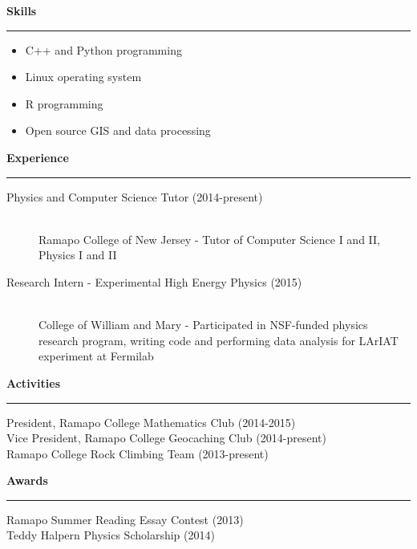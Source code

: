 \documentclass[letterpaper,10pt]{article}
\begin{document}
 \vspace{4 mm}
  
 \large
 \textbf{Skills}
 \vspace{1 mm}
 \hrule
 \normalsize
 
 \begin{multicols}{2}
  \begin{itemize}
   \item C++ and Python programming
   \item Linux operating system
   \item R programming
   \item Open source GIS and data processing
  \end{itemize}
 \end{multicols}
 
 \vspace{4 mm}

 \large
 \textbf{Experience}
 \vspace{1 mm}
 \hrule
 \normalsize
 
 \begin{description}
  \item[Physics and Computer Science Tutor (2014-present)] \hfill \\
   Ramapo College of New Jersey - Tutor of Computer Science I and II, Physics I and II
   
  \item[Research Intern - Experimental High Energy Physics (2015)] \hfill \\
   College of William and Mary - Participated in NSF-funded physics research program, writing code and performing data analysis for LArIAT experiment at Fermilab
 \end{description}
 
 \vspace{4 mm}

 \large
 \textbf{Activities}
 \vspace{1 mm}
 \hrule
 \normalsize
 
 \begin{description}
  \item[President, Ramapo College Mathematics Club (2014-2015)]
  \item[Vice President, Ramapo College Geocaching Club (2014-present)]
  \item[Ramapo College Rock Climbing Team (2013-present)]
 \end{description}
 
 \large
 \textbf{Awards}
 \vspace{1 mm}
 \hrule
 \normalsize
 
 \begin{description}
  \item[Ramapo Summer Reading Essay Contest (2013)]
  \item[Teddy Halpern Physics Scholarship (2014)]
 \end{description}
\end{document}
